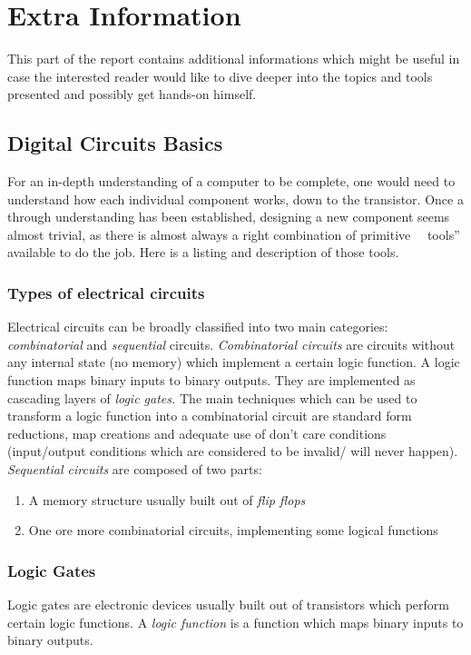 \chapter{Extra Information}
This part of the report contains additional informations which might be useful in case the interested reader
would like to dive deeper into the topics and tools presented and possibly get hands-on himself.

\section{Digital Circuits Basics}
For an in-depth understanding of a computer to be complete, one would need to understand how each individual
component works, down to the transistor. Once a through understanding has been established, designing a new component
seems almost trivial, as there is almost always a right combination of primitive ~~tools'' available to do the job.
Here is a listing and description of those tools.


\subsection{Types of electrical circuits}
Electrical circuits can be broadly classified into two main categories: \emph{combinatorial} and \emph{sequential} circuits. \emph{Combinatorial circuits} are circuits without any internal state (no memory) which implement a certain logic function. A logic function maps binary inputs to binary outputs. They are implemented as cascading layers of \emph{logic gates.} The main techniques which can be used to transform a logic function into a combinatorial circuit are standard form reductions, map creations and adequate use of don't care conditions (input/output conditions which are considered to be invalid/ will never happen). \emph{Sequential circuits} are composed of two parts:
\begin{enumerate}
  \item A memory structure usually built out of \emph{flip flops}
  \item One ore more combinatorial circuits, implementing some logical functions
\end{enumerate}

\subsection{Logic Gates}
Logic gates are electronic devices usually built out of transistors which perform certain logic functions.
A \emph{logic function} is a function which maps binary inputs to binary outputs.

